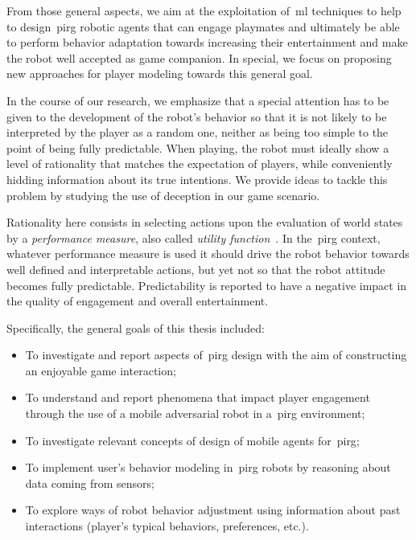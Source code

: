 From those general aspects, we aim at the exploitation of~\gls{ml} techniques to help to design~\gls{pirg} robotic agents that can engage playmates and ultimately be able to perform behavior adaptation towards increasing their entertainment and make the robot well accepted as game companion. In special, we focus on proposing new approaches for player modeling towards this general goal.

In the course of our research, we emphasize that a special attention has to be given to the development of the robot's behavior so that it is not likely to be interpreted by the player as a random one, neither as being too simple to the point of being fully predictable. When playing, the robot must ideally show a level of rationality that matches the expectation of players, while conveniently hidding information about its true intentions. We provide ideas to tackle this problem by studying the use of deception in our game scenario.

Rationality here consists in selecting actions upon the evaluation of world states by a \textit{performance measure}, also called \textit{utility function}~\citep{russell_artificial_2009}. In the~\gls{pirg} context, whatever performance measure is used it should drive the robot behavior towards well defined and interpretable actions, but yet not so that the robot attitude becomes fully predictable. Predictability is reported to have a negative impact in the quality of engagement and overall entertainment.   

Specifically, the general goals of this thesis included:

\begin{itemize}
\item To investigate and report aspects of~\gls{pirg} design with the aim of constructing an enjoyable game interaction; 
\item To understand and report phenomena that impact player engagement through the use of a mobile adversarial robot in a~\gls{pirg} environment;
\item To investigate relevant concepts of design of mobile agents for~\gls{pirg};
\item To implement user's behavior modeling in~\gls{pirg} robots by reasoning about data coming from sensors;
\item To explore ways of robot behavior adjustment using information about past interactions (player's typical behaviors, preferences, etc.).
\end{itemize}

